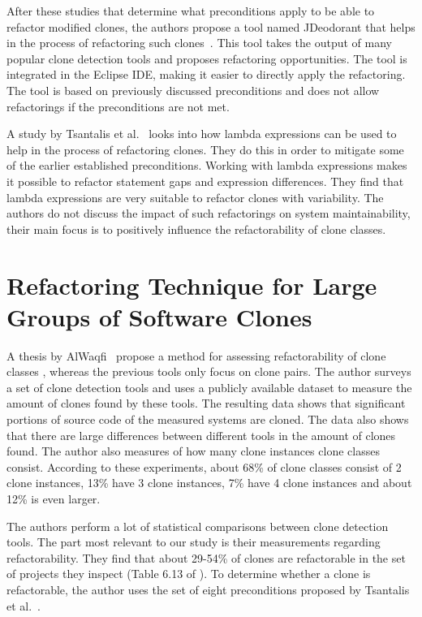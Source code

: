 After these studies that determine what preconditions apply to be able to refactor modified clones, the authors propose a tool named JDeodorant that helps in the process of refactoring such clones~\cite{mazinanian2016jdeodorant}. This tool takes the output of many popular clone detection tools \cite{kamiya2002ccfinder, deissenboeck2010flexible, jiang2007deckard, cordy2011nicad} and proposes refactoring opportunities. The tool is integrated in the Eclipse IDE, making it easier to directly apply the refactoring. The tool is based on previously discussed preconditions and does not allow refactorings if the preconditions are not met.

A study by Tsantalis et al.~\cite{tsantalis2017clone} looks into how lambda expressions can be used to help in the process of refactoring clones. They do this in order to mitigate some of the earlier established preconditions. Working with lambda expressions makes it possible to refactor statement gaps and expression differences. They find that lambda expressions are very suitable to refactor clones with variability. The authors do not discuss the impact of such refactorings on system maintainability, their main focus is to positively influence the refactorability of clone classes.

\section{Refactoring Technique for Large Groups of Software Clones}
A thesis by AlWaqfi~\cite{alwaqfi2017refactoring} propose a method for assessing refactorability of clone classes , whereas the previous tools only focus on clone pairs. The author surveys a set of clone detection tools \cite{kamiya2002ccfinder, baxter1999clonedr, jiang2007deckard, cordy2011nicad} and uses a publicly available dataset \cite{tsantalis2015assessing} to measure the amount of clones found by these tools. The resulting data shows that significant portions of source code of the measured systems are cloned. The data also shows that there are large differences between different tools in the amount of clones found. The author also measures of how many clone instances clone classes consist. According to these experiments, about 68\% of clone classes consist of 2 clone instances, 13\% have 3 clone instances, 7\% have 4 clone instances and about 12\% is even larger.

The authors perform a lot of statistical comparisons between clone detection tools. The part most relevant to our study is their measurements regarding refactorability. They find that about 29-54\% of clones are refactorable in the set of projects they inspect (Table 6.13 of \cite{alwaqfi2017refactoring}). To determine whether a clone is refactorable, the author uses the set of eight preconditions proposed by Tsantalis et al.~\cite{tsantalis2015assessing}.

